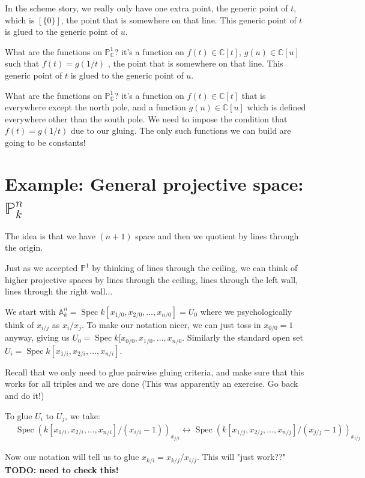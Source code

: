 \documentclass{book}
\newcommand{\C}{\ensuremath{\mathbb{C}}}
\renewcommand{\P}{\ensuremath{\mathbb{P}}}
\newcommand{\A}{\ensuremath{\mathbb{A}}}
\newcommand{\Spec}{\operatorname{Spec}}
\theoremstyle{definition}
\begin{document}
In the scheme story, we really only have one extra point, the generic 
point of $t$, which is $[\{0\}]$, the point that is somewhere on that line.
This generic point of $t$ is glued to the generic point of $u$.


What are the functions on $\P^1_\C$? it's a function on $f(t) \in \C[t]$,
$g(u) \in \C[u]$ such that $f(t) = g(1/t)$  , the point that is somewhere on that line.
This generic point of $t$ is glued to the generic point of $u$.


What are the functions on $\P^1_\C$? it's a function on $f(t) \in \C[t]$ that
is everywhere except the north pole, and a function $g(u) \in \C[u]$ which
is defined everywhere other than the south pole. We need
to impose the condition that $f(t) = g(1/t)$ due to our gluing. The only such
functions we can build are going to be constants!

\section{Example: General projective space: $\P_k^n$}

The idea is that we have $(n+1)$ space and then we quotient by lines
through the origin. 

Just as we accepted $\P^1$ by thinking of lines through the ceiling,
we can think of higher projective spaces by lines through the ceiling,
lines through the left wall, lines through the right wall...

We start with $\A^n_k = \Spec k[x_{1/0}, x_{2/0}, \dots, x_{n/0}] = U_0$
where we psychologically think of  $x_{i/j}$ as $x_i / x_j$. To make
our notation nicer, we can just toss in $x_{0/0} = 1$ anyway, giving
us $U_0 = \Spec k[x_{0/0}, x_{1/0}, \dots, x_{n/0}$.
Similarly the standard open set $U_i = \Spec k[x_{1/i}, x_{2/i}, \dots, x_{n/i}]$.


Recall that we only need to glue pairwise gluing criteria, and
make sure that this works for all triples and we are done (This was apparently
an exercise. Go back and do it!)


To glue $U_i$ to $U_j$, we take:
\begin{align*}
&\Spec \left(k[x_{1/i}, x_{2/i}, \dots, x_{n/i}]/(x_{i/i} - 1) \right)_{x_{j/i}}
\leftrightarrow
\Spec \left(k[x_{1/j}, x_{2/j}, \dots, x_{n/j}]/(x_{j/j} - 1) \right)_{x_{i/j}}
\end{align*}

Now our notation will tell us to glue $x_{k/i} = x_{k/j}/x_{i/j}$. This
will "just work??" \textbf{TODO: need to check this!}
\end{document}

